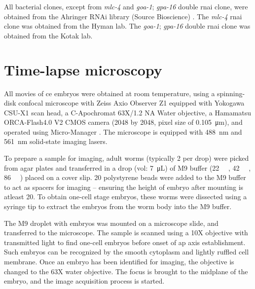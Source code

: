 All bacterial clones, except from \textit{mlc-4} and \textit{goa-1}; \textit{gpa-16} double \ac{rnai} clone, were obtained from the Ahringer RNAi library (Source Bioscience) \citep{kamath2003genome}. The \textit{mlc-4} \ac{rnai} clone was obtained from the Hyman lab. The \textit{goa-1}; \textit{gpa-16} double \ac{rnai} clone was obtained from the Kotak lab.

\section{Time-lapse microscopy}\label{sec:microscope}
All movies of \ac{ce} embryos were obtained at room temperature, using a spinning-disk confocal microscope with Zeiss Axio Observer Z1 equipped with Yokogawa CSU-X1 scan head, a C-Apochromat 63X/1.2 NA Water objective, a Hamamatsu ORCA-Flash4.0 V2 CMOS camera (\SI{2048}{\pixels} by \SI{2048}{\pixels}, pixel size of \SI{0.105}{\micro\meter}), and operated using Micro-Manager \citep{edelstein2014advanced}. The microscope is equipped with \SI{488}{\nano\meter} and \SI{561}{\nano\meter} solid-state imaging lasers.

To prepare a sample for imaging, adult worms (typically \num{2} per drop) were picked from agar plates and transferred in a drop (vol: \SI{7}{\micro\liter}) of M9 buffer (\SI{22}{\milli\Molar} , \SI{42}{\milli\Molar} , \SI{86}{\milli\Molar} ) placed on a cover slip. \SI{20}{\unitLength} polystyrene beads were added to the M9 buffer to act as spacers for imaging -- ensuring the height of embryo after mounting is atleast \SI{20}{\unitLength}. To obtain one-cell stage embryos, these worms were dissected using a syringe tip to extract the embryos from the worm body into the M9 buffer. 

The M9 droplet with embryos was mounted on a microscope slide, and transferred to the microscope. The sample is scanned using a \num{10}X objective with transmitted light to find one-cell embryos before onset of \ac{ap} axis establishment. Such embryos can be recognized by the smooth cytoplasm and lightly ruffled cell membrane. Once an embryo has been identified for imaging, the objective is changed to the \num{63}X water objective. The focus is brought to the midplane of the embryo, and the image acquisition process is started.

